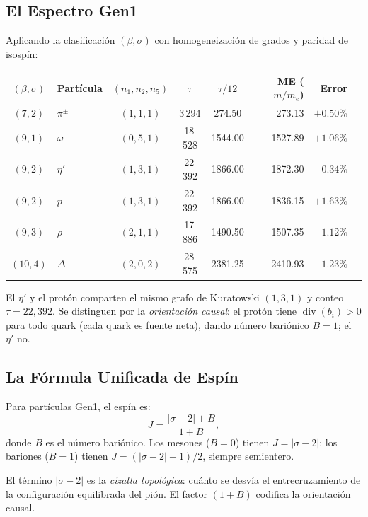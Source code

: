 \documentclass[11pt, a4paper, openany]{book}
\begin{document}
\subsection{El Espectro Gen1}

Aplicando la clasificaci\'on $(\beta, \sigma)$ con homogeneizaci\'on
de grados y paridad de isosp\'in:

\medskip
\begin{center}
\renewcommand{\arraystretch}{1.3}
\begin{tabular}{clcccrrl}
\toprule
$(\beta, \sigma)$ & Part\'icula & $(n_1, n_2, n_5)$ & $\tau$
  & $\tau/12$ & ME ($m/m_e$) & Error \\
\midrule
$(7, 2)$  & $\pi^{\pm}$ & $(1, 1, 1)$ & 3\,294  & 274{.}50
  & 273{.}13 & $+0{.}50\%$ \\
$(9, 1)$  & $\omega$     & $(0, 5, 1)$ & 18\,528 & 1544{.}00
  & 1527{.}89 & $+1{.}06\%$ \\
$(9, 2)$  & $\eta'$      & $(1, 3, 1)$ & 22\,392 & 1866{.}00
  & 1872{.}30 & $-0{.}34\%$ \\
$(9, 2)$  & $p$          & $(1, 3, 1)$ & 22\,392 & 1866{.}00
  & 1836{.}15 & $+1{.}63\%$ \\
$(9, 3)$  & $\rho$       & $(2, 1, 1)$ & 17\,886 & 1490{.}50
  & 1507{.}35 & $-1{.}12\%$ \\
$(10, 4)$ & $\Delta$     & $(2, 0, 2)$ & 28\,575 & 2381{.}25
  & 2410{.}93 & $-1{.}23\%$ \\
\bottomrule
\end{tabular}
\end{center}

\medskip
\noindent
El $\eta'$ y el prot\'on comparten el mismo grafo de Kuratowski
$(1, 3, 1)$ y conteo $\tau = 22{,}392$.  Se distinguen por la
\emph{orientaci\'on causal}: el prot\'on tiene
$\operatorname{div}(b_i) > 0$ para todo quark (cada quark es fuente
neta), dando n\'umero bari\'onico $B = 1$; el $\eta'$ no.

\subsection{La F\'ormula Unificada de Esp\'in}

\begin{theorem}
\label{thm:unified-spin}
Para part\'iculas Gen1, el esp\'in es:
\begin{equation}
  J = \frac{|\sigma - 2| + B}{1 + B},
  \label{eq:spin-unified}
\end{equation}
donde $B$ es el n\'umero bari\'onico.  Los mesones ($B = 0$) tienen
$J = |\sigma - 2|$; los bariones ($B = 1$) tienen
$J = (|\sigma - 2| + 1)/2$, siempre semientero.

El t\'ermino $|\sigma - 2|$ es la \emph{cizalla topol\'ogica}:
cu\'anto se desv\'ia el entrecruzamiento de la configuraci\'on
equilibrada del pi\'on.  El factor $(1 + B)$ codifica la orientaci\'on
causal.
\end{theorem}
\end{document}
